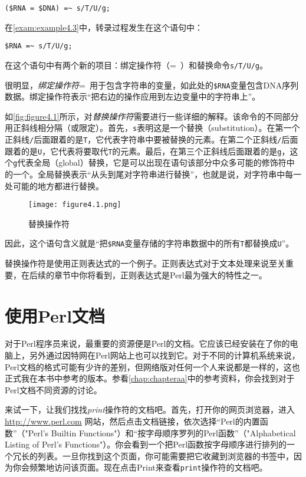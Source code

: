 \begin{lstlisting}
($RNA = $DNA) =~ s/T/U/g;
\end{lstlisting}

在\autoref{exam:example4.3}中，转录过程发生在这个语句中：

\begin{lstlisting}
$RNA =~ s/T/U/g;
\end{lstlisting}

在这个语句中有两个新的项目：绑定操作符（=~）和替换命令\verb|s/T/U/g|。

很明显，\textit{绑定操作符}=~用于包含字符串的变量，如此处的\verb|$RNA|变量包含DNA序列数据。绑定操作符表示“把右边的操作应用到左边变量中的字符串上”。

如\autoref{fig:figure4.1}所示，对\textit{替换操作符}需要进行一些详细的解释。该命令的不同部分用正斜线相分隔（或限定）。首先，\verb|s|表明这是一个替换（substitution）。在第一个正斜线\verb|/|后面跟着的是\verb|T|，它代表字符串中要被替换的元素。在第二个正斜线\verb|/|后面跟着的是\verb|U|，它代表将要取代\verb|T|的元素。最后，在第三个正斜线后面跟着的是\verb|g|，这个\verb|g|代表全局（global）替换，它是可以出现在语句该部分中众多可能的修饰符中的一个。全局替换表示“从头到尾对字符串进行替换”，也就是说，对字符串中每一处可能的地方都进行替换。

\begin{figure}
  \centering
  \texttt{[image: figure4.1.png]}
  \caption{替换操作符}
  \label{fig:figure4.1}
\end{figure}

因此，这个语句含义就是“把\verb|$RNA|变量存储的字符串数据中的所有\verb|T|都替换成\verb|U|”。

替换操作符是使用正则表达式的一个例子。正则表达式对于文本处理来说至关重要，在后续的章节中你将看到，正则表达式是Perl最为强大的特性之一。

\section{使用Perl文档}
对于Perl程序员来说，最重要的资源便是Perl的文档。它应该已经安装在了你的电脑上，另外通过因特网在Perl网站上也可以找到它。对于不同的计算机系统来说，Perl文档的格式可能有少许的差别，但网络版对任何一个人来说都是一样的，这也正式我在本书中参考的版本。参看\autoref{chap:chapteraa}中的参考资料，你会找到对于Perl文档不同资源的讨论。

来试一下，让我们找找\textit{print}操作符的文档吧。首先，打开你的网页浏览器，进入 \href{http://www.perl.com}{http://www.perl.com} 网站，然后点击文档链接，依次选择“Perl的内置函数”（"Perl's Builtin Functions"）和“按字母顺序罗列的Perl函数”（"Alphabetical Listing of Perl's Functions"）。你会看到一个把Perl函数按字母顺序进行排列的一个冗长的列表。一旦你找到这个页面，你可能需要把它收藏到浏览器的书签中，因为你会频繁地访问该页面。现在点击Print来查看\verb|print|操作符的文档吧。

